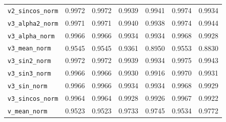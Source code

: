 \documentclass{article}
\begin{document}
\begin{longtable}{l cccccc}
\texttt{v2\_sincos\_norm} & 0.9972 & 0.9972 & 0.9939 & 0.9941 & 0.9974 & 0.9934 \\
\texttt{v3\_alpha2\_norm} & 0.9971 & 0.9971 & 0.9940 & 0.9938 & 0.9974 & 0.9944 \\
\texttt{v3\_alpha\_norm} & 0.9966 & 0.9966 & 0.9934 & 0.9934 & 0.9968 & 0.9928 \\
\texttt{v3\_mean\_norm} & 0.9545 & 0.9545 & 0.9361 & 0.8950 & 0.9553 & 0.8830 \\
\texttt{v3\_sin2\_norm} & 0.9972 & 0.9972 & 0.9939 & 0.9934 & 0.9975 & 0.9943 \\
\texttt{v3\_sin3\_norm} & 0.9966 & 0.9966 & 0.9930 & 0.9916 & 0.9970 & 0.9931 \\
\texttt{v3\_sin\_norm} & 0.9966 & 0.9966 & 0.9934 & 0.9934 & 0.9968 & 0.9929 \\
\texttt{v3\_sincos\_norm} & 0.9964 & 0.9964 & 0.9928 & 0.9926 & 0.9967 & 0.9922 \\
\texttt{v\_mean\_norm} & 0.9523 & 0.9523 & 0.9733 & 0.9745 & 0.9534 & 0.9772 \\
\end{longtable}
\end{document}
